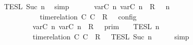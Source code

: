 \begin{isabellebody}
\ \ \ \ \ \ \ \ {\isasyminter}\ {\isasymlbrakk}{\isasymlbrakk}\ {\isasymPhi}\ {\isasymrbrakk}{\isasymrbrakk}\isactrlsub T\isactrlsub E\isactrlsub S\isactrlsub L\isactrlbsup {\isasymge}\ Suc\ n\isactrlesup {\isacartoucheclose}\ \isamarkupfalse%
\ simp\isanewline
\ \ \isamarkupfalse%
\ \isamarkupfalse%
\ {\isacartoucheopen}{\isasymlbrakk}\ {\isacharparenleft}{\isacharparenleft}{\isasymlfloor}{\isasymtau}\isactrlsub v\isactrlsub a\isactrlsub r{\isacharparenleft}C\ n{\isacharparenright}{\isacharcomma}\ {\isasymtau}\isactrlsub v\isactrlsub a\isactrlsub r{\isacharparenleft}C\ n{\isacharparenright}{\isasymrfloor}\ {\isasymin}\ R{\isacharparenright}\ {\isacharhash}\ {\isasymGamma}{\isacharparenright}{\isacharcomma}\ n\isanewline
\ \ \ \ \ \ \ \ \ \ \ \ \ \ \ \ \ \ {\isasymturnstile}\ {\isasymPsi}\ {\isasymtriangleright}\ {\isacharparenleft}{\isacharparenleft}time{\isacharminus}relation\ {\isasymlfloor}C\ C\ {\isasymin}\ R{\isacharparenright}\ {\isacharhash}\ {\isasymPhi}{\isacharparenright}\ {\isasymrbrakk}\isactrlsub c\isactrlsub o\isactrlsub n\isactrlsub f\isactrlsub i\isactrlsub g\isanewline
\ \ \ \ \ \ \ \ \ \ \ \ \ \ \ \ \ {\isacharequal}\ {\isasymlbrakk}{\isasymlbrakk}\ {\isacharparenleft}{\isasymlfloor}{\isasymtau}\isactrlsub v\isactrlsub a\isactrlsub r{\isacharparenleft}C\ n{\isacharparenright}{\isacharcomma}\ {\isasymtau}\isactrlsub v\isactrlsub a\isactrlsub r{\isacharparenleft}C\ n{\isacharparenright}{\isasymrfloor}\ {\isasymin}\ R{\isacharparenright}\ {\isacharhash}\ {\isasymGamma}\ {\isasymrbrakk}{\isasymrbrakk}\isactrlsub p\isactrlsub r\isactrlsub i\isactrlsub m\ {\isasyminter}\ {\isasymlbrakk}{\isasymlbrakk}\ {\isasymPsi}\ {\isasymrbrakk}{\isasymrbrakk}\isactrlsub T\isactrlsub E\isactrlsub S\isactrlsub L\isactrlbsup {\isasymge}\ n\isactrlesup \isanewline
\ \ \ \ \ \ \ \ \ \ \ \ \ \ \ \ \ {\isasyminter}\ {\isasymlbrakk}{\isasymlbrakk}\ {\isacharparenleft}time{\isacharminus}relation\ {\isasymlfloor}C\ C\ {\isasymin}\ R{\isacharparenright}\ {\isacharhash}\ {\isasymPhi}\ {\isasymrbrakk}{\isasymrbrakk}\isactrlsub T\isactrlsub E\isactrlsub S\isactrlsub L\isactrlbsup {\isasymge}\ Suc\ n\isactrlesup {\isacartoucheclose}\isanewline
\ \ \ \ \isamarkupfalse%
\ simp\isanewline

\end{isabellebody}

